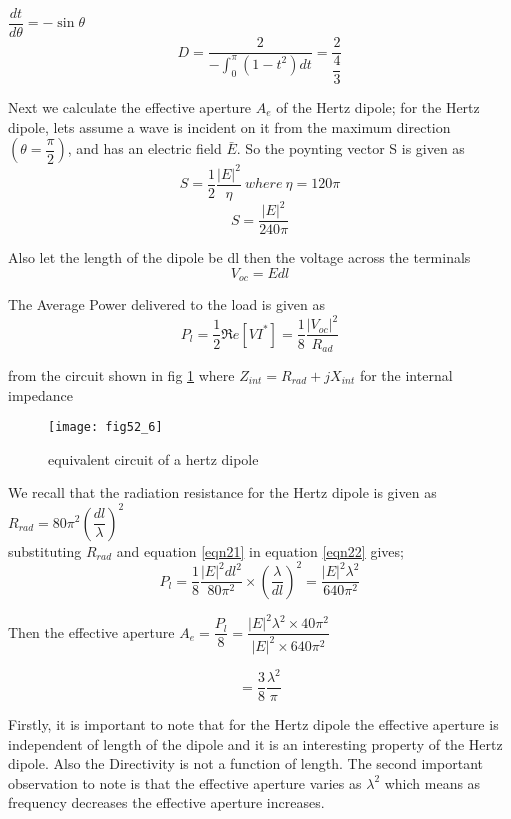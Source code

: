 $\dfrac{dt}{d\theta}=-\sin\theta$
$$ D=\dfrac{2}{-\int_{0}^{\pi}(1-t^{2})dt} = \dfrac{2}{\dfrac{4}{3}} $$


Next we calculate the effective aperture $A_{e}$ of the Hertz dipole; for the Hertz dipole, lets assume a wave is incident on it from the maximum direction $(\theta=\dfrac{\pi}{2})$, and has an electric field $\bar{E}$. So the poynting vector S is given as 
$$ S= \dfrac{1}{2}\dfrac{|E|^{{2}}}{\eta} \ where \  \eta =120\pi$$
$$ S= \dfrac{|E|^{{2}}}{240\pi}$$
\newline

Also let the length of the dipole be dl then the voltage across the terminals
\begin{equation}
V_{oc}=Edl
\label{eqn21}
\end{equation}

The Average Power delivered to the load is given as
\begin{equation}
P_{l}=\dfrac{1}{2}\Re e [VI^{*}]=\dfrac{1}{8}\dfrac{|V_{oc}|^{2}}{R_{ad}}
\label{eqn22}
\end{equation}

from the circuit shown in fig \ref{fig6} where $Z_{int}=R_{rad}+jX_{int} $ for the internal impedance 

\begin{figure}[h]
	\texttt{[image: fig52\_6]}
	\centering
	\centering
	\caption{equivalent circuit of a hertz dipole}
	\label{fig6}	
\end{figure}
We recall that the radiation resistance for the Hertz dipole is given as $R_{rad}=80\pi^{2}(\dfrac{dl}{\lambda})^{2}$
\\
substituting $R_{rad}$ and equation \ref{eqn21} in equation \ref{eqn22} gives; 
\\
$$	P_{l}=\dfrac{1}{8}\dfrac{|E|^{2}dl^{2}}{80\pi^{2}}\times\left(\dfrac{\lambda}{dl}\right)^{2}= \dfrac{|E|^{2}\lambda^{2}}{640\pi^{2}}$$


Then the effective aperture $A_{e}=\dfrac{P_{l}}{8}=\dfrac{|E|^{2}\lambda^{2}\times40\pi^{2}}{|E|^{2}\times640\pi^{2}}$

$$=\dfrac{3}{8}\dfrac{\lambda^{2}}{\pi}$$
\newline

Firstly, it is important to note that for the Hertz dipole the effective aperture is independent of length of the dipole and it is an interesting property of the Hertz dipole. Also the Directivity is not a function of length. The second important observation to note is that the effective aperture varies as $\lambda^{2}$ which means as frequency decreases the effective aperture increases.
